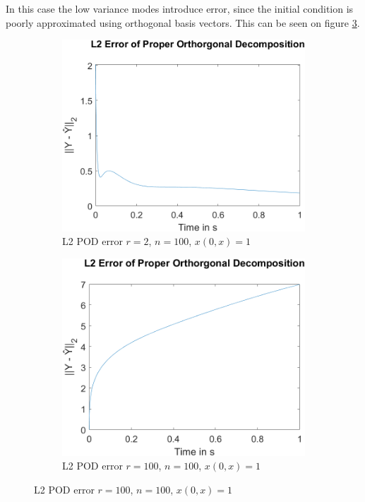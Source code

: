 In this case the low variance modes introduce error, since the initial condition is poorly approximated using orthogonal basis vectors.
This can be seen on figure \ref{fig-pod-100}.
\begin{figure}[H]
\begin{subfigure}[b]{0.5\textwidth}
\centering
\includegraphics[width=\textwidth]{images/L2_Proper Orthorgonal Decomposition_2_100}
\caption{L2 POD error $r=2$, $n=100$, $x(0, x) = 1$}
\label{fig:fig-pod-2-100}
\end{subfigure}
\begin{subfigure}[b]{0.5\textwidth}
\centering
\includegraphics[width=\textwidth]{images/L2_Proper Orthorgonal Decomposition_100_100}
\caption{L2 POD error $r=100$, $n=100$, $x(0, x) = 1$}
\label{fig:fig-pod-100-100}
\end{subfigure}
\label{fig-pod-100}
\end{figure}
